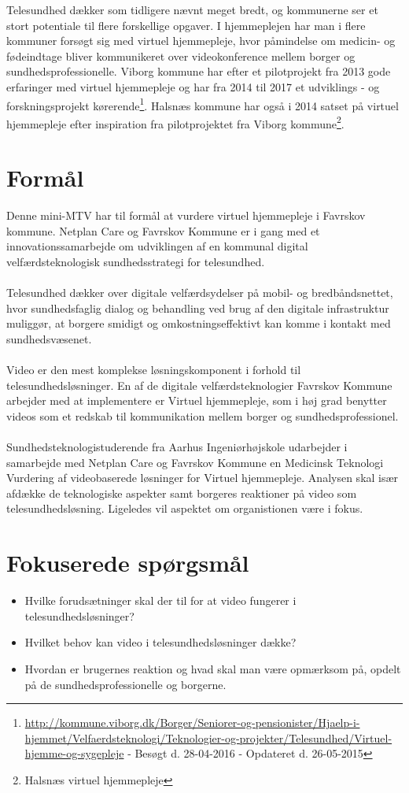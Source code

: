 Telesundhed dækker som tidligere nævnt meget bredt, og kommunerne ser et stort potentiale til flere forskellige opgaver. I hjemmeplejen har man i flere kommuner forsøgt sig med virtuel hjemmepleje, hvor påmindelse om medicin- og fødeindtage bliver kommunikeret over videokonference mellem borger og sundhedsprofessionelle. Viborg kommune har efter et pilotprojekt fra 2013 gode erfaringer med virtuel hjemmepleje og har fra 2014 til 2017 et  udviklings - og forskningsprojekt kørerende\footnote{\url{http://kommune.viborg.dk/Borger/Seniorer-og-pensionister/Hjaelp-i-hjemmet/Velfaerdsteknologi/Teknologier-og-projekter/Telesundhed/Virtuel-hjemme-og-sygepleje} - Besøgt d. 28-04-2016 - Opdateret d. 26-05-2015}. Halsnæs kommune har også i 2014 satset på virtuel hjemmepleje efter inspiration fra pilotprojektet fra Viborg kommune\footnote{Halsnæs virtuel hjemmepleje}.    
 

\section{Formål}
Denne mini-MTV har til formål at vurdere virtuel hjemmepleje i Favrskov kommune. Netplan Care og Favrskov Kommune er i gang med et innovationssamarbejde om udviklingen af en kommunal digital velfærdsteknologisk sundhedsstrategi for telesundhed. 
\\ \\
Telesundhed dækker over digitale velfærdsydelser på mobil- og bredbåndsnettet, hvor sundhedsfaglig dialog og behandling ved brug af den digitale infrastruktur muliggør, at borgere smidigt og omkostningseffektivt kan komme i kontakt med sundhedsvæsenet.    
\\ \\
Video er den mest komplekse løsningskomponent i forhold til telesundhedsløsninger. En af de digitale velfærdsteknologier Favrskov Kommune arbejder med at implementere er Virtuel hjemmepleje, som i høj grad benytter videos som et redskab til kommunikation mellem borger og sundhedsprofessionel. 
\\ \\
Sundhedsteknologistuderende fra Aarhus Ingeniørhøjskole udarbejder i samarbejde med Netplan Care og Favrskov Kommune en Medicinsk Teknologi Vurdering af videobaserede løsninger for Virtuel hjemmepleje. Analysen skal især afdække de teknologiske aspekter samt borgeres reaktioner på video som telesundhedsløsning. Ligeledes vil aspektet om organistionen være i fokus. 

\section{Fokuserede spørgsmål}
\begin{itemize}
	\item Hvilke forudsætninger skal der til for at video fungerer i telesundhedsløsninger? 
	\item Hvilket behov kan video i telesundhedsløsninger dække?
	\item Hvordan er brugernes reaktion og hvad skal man være opmærksom på, opdelt på de sundhedsprofessionelle og borgerne. 
\end{itemize}

